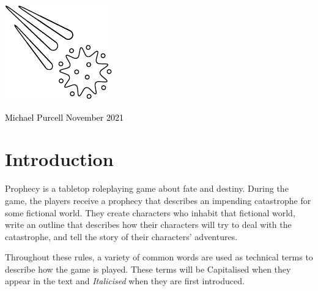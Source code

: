 \documentclass[12pt, a5paper, parskip=half-]{scrartcl}
\begin{document}
\begin{titlepage}
		\enlargethispage{5\baselineskip}

         \setmainfont{Cinzel Decorative}
	    \centering{
			{\fontsize{60}{72}\selectfont
			{\textcolor{black}{pROpHecY}}}
		}


		\setmainfont{URWClassico}
		\vspace{10mm}
		\centering{\Large{{\textcolor{black}
{A tabletop roleplaying game\\ \smallskip about fate and destiny}}}}

\vfill

\includegraphics[scale=3.85]{Images/comet_diagram.pdf}

		\vfill
		
		\raggedright{\Large{{\textcolor{black}{Michael Purcell \hfill November 2021}}}}

\end{titlepage}



\setmainfont{URWClassico}
\normalsize
\raggedright
\section*{Introduction}
Prophecy is a tabletop roleplaying game about fate and destiny. During the game, the players receive a prophecy that describes an impending catastrophe for some fictional world. They create characters who inhabit that fictional world, write an outline that describes how their characters will try to deal with the catastrophe, and tell the story of their characters' adventures.

Throughout these rules, a variety of common words are used as technical terms to describe how the game is played. These terms will be Capitalised when they appear in the text and \emph{Italicised} when they are first introduced.
\end{document}
